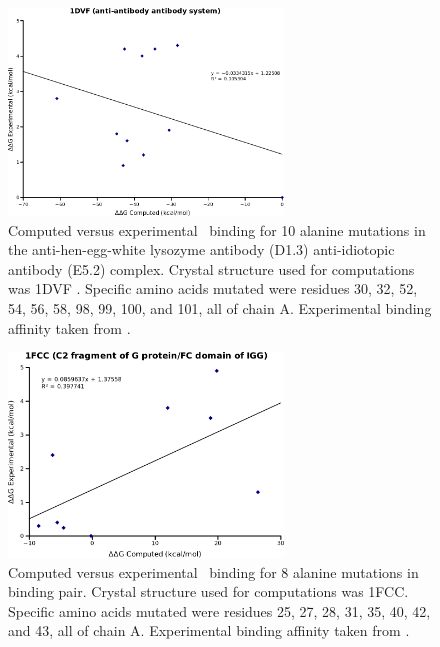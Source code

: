 \begin{figure}[H]
    \centering
  \includegraphics[width=0.65\textwidth]{figures/1dvf.png}
  \caption{
Computed versus experimental \ddg\ binding for 10 alanine mutations in the anti-hen-egg-white lysozyme antibody (D1.3) anti-idiotopic antibody (E5.2) complex.
Crystal structure used for computations was 1DVF \protect\cite{braden1996crystal}.
Specific amino acids mutated were residues 30, 32, 52, 54, 56, 58, 98, 99, 100, and 101, all of chain A.
Experimental binding affinity taken from \protect\cite{thorn2001asedb}.
            }
\end{figure}

\begin{figure}[H]
    \centering
  \includegraphics[width=0.65\textwidth]{figures/1fcc.png}
  \caption{
Computed versus experimental \ddg\ binding for 8 alanine mutations in  binding pair.
Crystal structure used for computations was 1FCC.
Specific amino acids mutated were residues 25, 27, 28, 31, 35, 40, 42, and 43, all of chain A.
Experimental binding affinity taken from \protect\cite{thorn2001asedb}.
            }
\end{figure}
